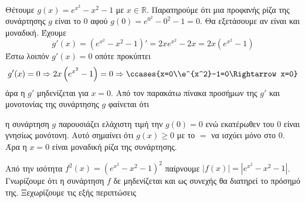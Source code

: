 \documentclass[internet]{diag-pan-xelatex}
\begin{document}
\begin{thema}
\begin{erwthma}
\begin{center}
\end{center}
\end{erwthma}
\item \mbox{}\\\vspace{-5mm}
\begin{erwthma}
\item\label{g1} Θέτουμε $ g(x)=e^{x^2}-x^2-1 $ με $ x\in\mathbb{R} $. Παρατηρούμε ότι μια προφανής ρίζα της συνάρτησης $ g $ είναι το $ 0 $ αφού $ g(0)=e^{0^2}-0^2-1=0 $. Θα εξετάσουμε αν είναι και μοναδική. Έχουμε 
\[ g'(x)=\left( e^{x^2}-x^2-1\right)'=2xe^{x^2}-2x=2x\left( e^{x^2}-1\right) \]
Έστω λοιπόν $ g'(x)=0 $ οπότε προκύπτει
\[ g'(x)=0\Rightarrow 2x\left( e^{x^2}-1\right)=0\Rightarrow\ccases{x=0\\e^{x^2}-1=0\Rightarrow x=0} \]
άρα η $ g' $ μηδενίζεται για $ x=0 $. Από τον παρακάτω πίνακα προσήμων της $ g' $ και μονοτονίας της συνάρτησης $ g $ φαίνεται ότι
\begin{center}
\end{center}
η συνάρτηση $ g $ παρουσιάζει ελάχιστη τιμή την $ g(0)=0 $ ενώ εκατέρωθεν του $ 0 $ είναι γνησίως μονότονη. Αυτό σημαίνει ότι $ g(x)\geq0 $ με το $ = $ να ισχύει μόνο στο $ 0 $. Άρα η $ x=0 $ είναι μοναδική ρίζα της συνάρτησης.\\
\item Από την ισότητα $ f^2(x)=\left( e^{x^2}-x^2-1\right)^2  $ παίρνουμε $ |f(x)|=\left| e^{x^2}-x^2-1\right| $. Γνωρίζουμε ότι η συνάρτηση $ f $ δε μηδενίζεται και ως συνεχής θα διατηρεί το πρόσημό της. Ξεχωρίζουμε τις εξής περιπτώσεις

\end{erwthma}
\end{thema}
\end{document}
